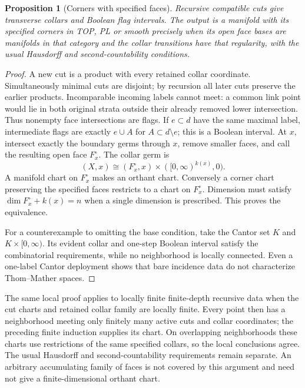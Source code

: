 \documentclass[11pt,a4paper]{article}
\newtheorem{proposition}[theorem]{Proposition}
\theoremstyle{definition}
\begin{document}
\begin{proposition}[Corners with specified faces]\label{prop:corners}
Recursive compatible cuts give transverse collars and Boolean flag
intervals. The output is a manifold with its specified corners in TOP,
PL or smooth precisely when its open face bases are manifolds in that
category and the collar transitions have that regularity, with the
usual Hausdorff and second-countability conditions.
\end{proposition}
\begin{proof}
A new cut is a product with every retained collar coordinate.
Simultaneously minimal cuts are disjoint; by recursion all later cuts
preserve the earlier products. Incomparable incoming labels cannot meet:
a common link point would lie in both original strata outside their
already removed lower intersection. Thus nonempty face intersections
are flags. If $e\subset d$ have the same maximal label, intermediate
flags are exactly $e\cup A$ for $A\subset d\setminus e$; this is a
Boolean interval. At $x$, intersect exactly the boundary germs through
$x$, remove smaller faces, and call the resulting open face $F_x^\circ$.
The collar germ is
\[
 (X,x)\cong(F_x^\circ,x)\times([0,\infty)^{k(x)},0).
\]
A manifold chart on $F_x^\circ$ makes an orthant chart. Conversely a
corner chart preserving the specified faces restricts to a chart on
$F_x^\circ$. Dimension must satisfy $\dim F_x^\circ+k(x)=n$ when a
single dimension is prescribed. This proves the equivalence.

For a counterexample to omitting the base condition, take the Cantor
set $K$ and $K\times[0,\infty)$. Its evident collar and one-step
Boolean interval satisfy the combinatorial requirements, while no
neighborhood is locally connected. Even a one-label Cantor deployment
shows that bare incidence data do not characterize Thom--Mather spaces.
\end{proof}

The same local proof applies to locally finite finite-depth recursive
data when the cut charts and retained collar family are locally finite.
Every point then has a neighborhood meeting only finitely many active
cuts and collar coordinates; the preceding finite induction supplies
its chart. On overlapping neighborhoods these charts use restrictions
of the same specified collars, so the local conclusions agree. The
usual Hausdorff and second-countability requirements remain separate.
An arbitrary accumulating family of faces is not covered by this
argument and need not give a finite-dimensional orthant chart.
\end{document}

